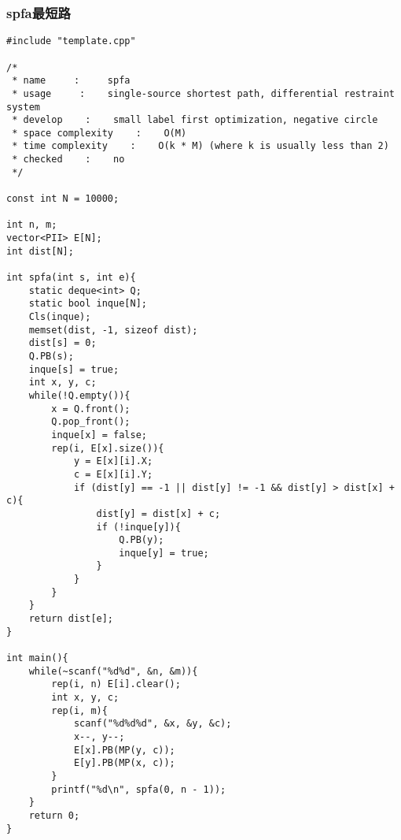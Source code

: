 \subsubsection{spfa最短路}
\begin{verbatim}
#include "template.cpp"

/*
 * name     :     spfa
 * usage     :    single-source shortest path, differential restraint system
 * develop    :    small label first optimization, negative circle
 * space complexity    :    O(M)
 * time complexity    :    O(k * M) (where k is usually less than 2)
 * checked    :    no
 */

const int N = 10000;

int n, m;
vector<PII> E[N];
int dist[N];

int spfa(int s, int e){
    static deque<int> Q;
    static bool inque[N];
    Cls(inque);
    memset(dist, -1, sizeof dist);
    dist[s] = 0;
    Q.PB(s);
    inque[s] = true;
    int x, y, c;
    while(!Q.empty()){
        x = Q.front();
        Q.pop_front();
        inque[x] = false;
        rep(i, E[x].size()){
            y = E[x][i].X;
            c = E[x][i].Y;
            if (dist[y] == -1 || dist[y] != -1 && dist[y] > dist[x] + c){
                dist[y] = dist[x] + c;
                if (!inque[y]){
                    Q.PB(y);
                    inque[y] = true;
                }
            }
        }
    }
    return dist[e];
}

int main(){
    while(~scanf("%d%d", &n, &m)){
        rep(i, n) E[i].clear();
        int x, y, c;
        rep(i, m){
            scanf("%d%d%d", &x, &y, &c);
            x--, y--;
            E[x].PB(MP(y, c));
            E[y].PB(MP(x, c));
        }
        printf("%d\n", spfa(0, n - 1));
    }
    return 0;
}
\end{verbatim}
